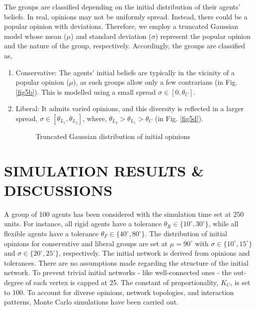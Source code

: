 \documentclass[letterpaper,english,11pt]{article}
\begin{document}
The groups are classified depending on the initial distribution of their agents' beliefs. In real, opinions may not be uniformly spread.  Instead, there could be a popular opinion with deviations. Therefore, we employ a truncated Gaussian model whose mean ($\mu$) and standard deviation ($\sigma$) represent the popular opinion and the nature of the group, respectively. Accordingly, the groups are classified as,
\begin{enumerate}
	\item{Conservative:} The agents' initial beliefs are typically in the vicinity of a popular opinion ($\mu$), as such groups allow only a few contrarians (in Fig. \ref{fig5b}). This is modelled using a small spread $\sigma \in [0,\theta_{C}]$.
	\item{Liberal:} It admits varied opinions, and this diversity is reflected in a larger spread, $\sigma \in [\theta_{L_{1}},\theta_{L_{2}}]$, where, $\theta_{L_{2}}>\theta_{L_{1}}>\theta_{C}$ (in Fig. \ref{fig5d}).
	\begin{figure}
		\hfil
		\hfil
		\caption{Truncated Gaussian distribution of initial opinions}
		\label{fig5}
	\end{figure}
\end{enumerate}

\section{SIMULATION RESULTS \& DISCUSSIONS}

A group of 100 agents has been considered with the simulation time set at 250 units. For instance, all rigid agents have a tolerance $\theta_{R} \in \{10^\circ,30^\circ\}$, while all flexible agents have a tolerance $\theta_{F} \in \{40^\circ,80^\circ\}$. The distribution of initial opinions for conservative and liberal groups are set at $\mu = 90^\circ$ with $\sigma \in \{10^\circ,15^\circ\}$ and $\sigma \in \{20^\circ,25^\circ\}$, respectively. The initial network is derived from opinions and tolerances. There are no assumptions made regarding the structure of the initial network. To prevent trivial initial networks - like well-connected ones - the out-degree of each vertex is capped at 25. The constant of proportionality, $K_{C}$, is set to 100. To account for diverse opinions, network topologies, and interaction patterns, Monte Carlo simulations have been carried out.	
\end{document}
